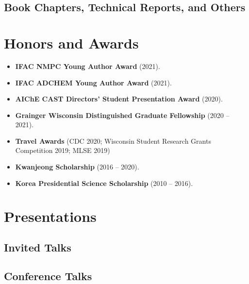 \documentclass{article}
\begin{document}
\subsection*{Book Chapters, Technical Reports, and Others}
\renewcommand*{\labelenumi}{[B\theenumi]}

\section*{Honors and Awards}
\begin{itemize}[leftmargin=*]
\item[] {\bf IFAC NMPC Young Author Award} (2021).
\item[] {\bf IFAC ADCHEM Young Author Award} (2021).
\item[] {\bf AIChE CAST Directors' Student Presentation Award} (2020).
\item[] {\bf Grainger Wisconsin Distinguished Graduate Fellowship} (2020 -- 2021).
\item[] {\bf Travel Awards} (CDC 2020; Wisconsin Student Research Grants Competition 2019; MLSE 2019)
\item[] {\bf Kwanjeong Scholarship} (2016 -- 2020).
\item[] {\bf Korea Presidential Science Scholarship} (2010 -- 2016).
\end{itemize}

\section*{Presentations}
\subsection*{Invited Talks}
\renewcommand*{\labelenumi}{[I\theenumi]}
\subsection*{Conference Talks}
\renewcommand*{\labelenumi}{[P\theenumi]}
\end{document}
